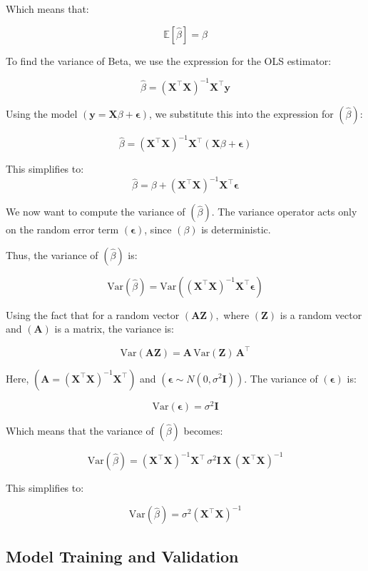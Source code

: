 Which means that: 

$$\mathbb{E}[\hat{\beta}] = \beta$$

To find the variance of Beta, we use the expression for the OLS estimator:

$$\hat{\beta} = (\mathbf{X}^\top \mathbf{X})^{-1} \mathbf{X}^\top \mathbf{y}$$

Using the model $( \mathbf{y} = \mathbf{X} \beta + \boldsymbol{\epsilon} )$, we substitute this into the expression for $( \hat{\beta} )$:

$$\hat{\beta} = (\mathbf{X}^\top \mathbf{X})^{-1} \mathbf{X}^\top (\mathbf{X} \beta + \boldsymbol{\epsilon})$$

This simplifies to:
$$\hat{\beta} = \beta + (\mathbf{X}^\top \mathbf{X})^{-1} \mathbf{X}^\top \boldsymbol{\epsilon}$$

We now want to compute the variance of $( \hat{\beta} )$. The variance operator acts only on the random error term $( \boldsymbol{\epsilon} )$, since $( \beta )$ is deterministic.

Thus, the variance of $( \hat{\beta} )$ is:

$$\text{Var}(\hat{\beta}) = \text{Var}\left((\mathbf{X}^\top \mathbf{X})^{-1} \mathbf{X}^\top \boldsymbol{\epsilon}\right)$$

Using the fact that for a random vector $( \mathbf{A} \mathbf{Z} ),$ where $( \mathbf{Z} )$ is a random vector and $( \mathbf{A} )$ is a matrix, the variance is:

$$\text{Var}(\mathbf{A} \mathbf{Z}) = \mathbf{A} \, \text{Var}(\mathbf{Z}) \, \mathbf{A}^\top$$

Here, $( \mathbf{A} = (\mathbf{X}^\top \mathbf{X})^{-1} \mathbf{X}^\top )$ and $( \boldsymbol{\epsilon} \sim N(0, \sigma^2 \mathbf{I}))$. The variance of $( \boldsymbol{\epsilon} )$ is:

$$\text{Var}(\boldsymbol{\epsilon}) = \sigma^2 \mathbf{I}$$

Which means that the variance of $( \hat{\beta} )$ becomes:

$$\text{Var}(\hat{\beta}) = (\mathbf{X}^\top \mathbf{X})^{-1} \mathbf{X}^\top \, \sigma^2 \mathbf{I} \, \mathbf{X} \, (\mathbf{X}^\top \mathbf{X})^{-1}$$

This simplifies to:

$$\text{Var}(\hat{\beta}) = \sigma^2 (\mathbf{X}^\top \mathbf{X})^{-1}$$
\subsection{Model Training and Validation}

